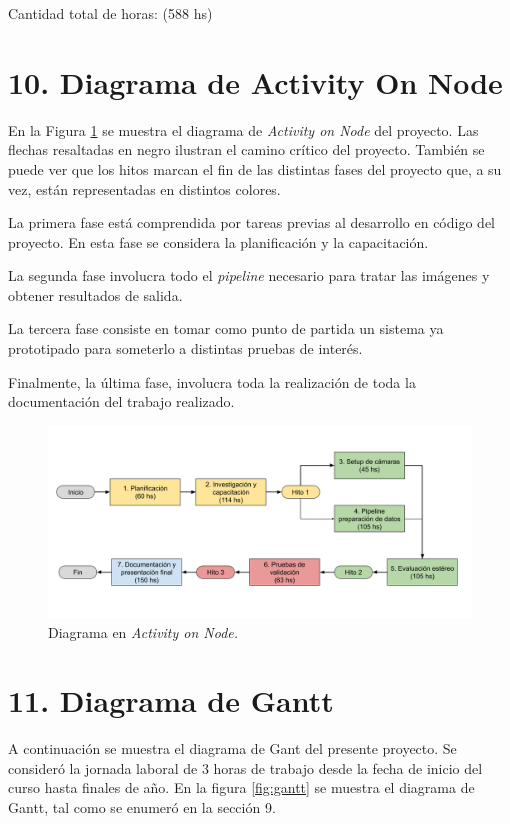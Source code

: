 \documentclass[
11pt, %
]{charter}
\begin{document}
Cantidad total de horas: (588 hs)

\section{10. Diagrama de Activity On Node}
\label{sec:AoN}

En la Figura \ref{fig:aon} se muestra el diagrama de \emph{Activity on Node} del proyecto. Las flechas resaltadas en negro ilustran el camino crítico del proyecto. También se puede ver que los hitos marcan el fin de las distintas fases del proyecto que, a su vez, están representadas en distintos colores. 

La primera fase está comprendida por tareas previas al desarrollo en código del proyecto. En esta fase se considera la planificación y la capacitación.

La segunda fase involucra todo el \emph{pipeline} necesario para tratar las imágenes y obtener resultados de salida.

La tercera fase consiste en tomar como punto de partida un sistema ya prototipado para someterlo a distintas pruebas de interés.

Finalmente, la última fase, involucra toda la realización de toda la documentación del trabajo realizado.

\begin{figure}[htpb]
\centering 
\includegraphics[width=\textwidth]{./Figuras/aon.png}
\caption{Diagrama en \textit{Activity on Node.}}
\label{fig:aon}
\end{figure}

\section{11. Diagrama de Gantt}
\label{sec:gantt}

A continuación se muestra el diagrama de Gant del presente proyecto. Se consideró la jornada laboral de 3 horas de trabajo desde la fecha de inicio del curso hasta finales de año.
En la figura \ref{fig:gantt} se muestra el diagrama de Gantt, tal como se enumeró en la sección 9.
\end{document}
